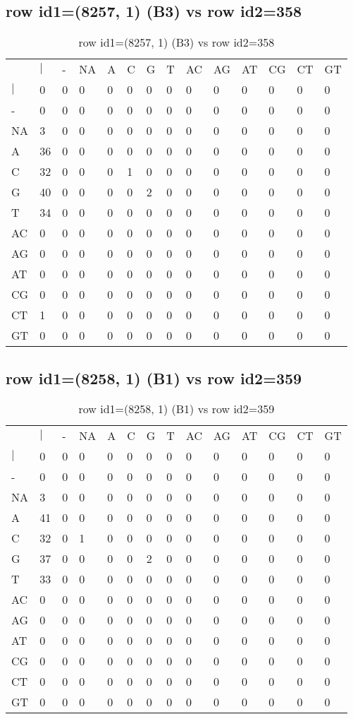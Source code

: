 \subsection{row id1=(8257, 1) (B3) vs row id2=358}
\begin{center}
\begin{longtable}{|l|l|l|l|l|l|l|l|l|l|l|l|l|l|}
\caption{row id1=(8257, 1) (B3) vs row id2=358} \label{table_dm396}\\
\hline
\\
\hline
&$|$&-&NA&A&C&G&T&AC&AG&AT&CG&CT&GT\\
$|$&0&0&0&0&0&0&0&0&0&0&0&0&0\\
-&0&0&0&0&0&0&0&0&0&0&0&0&0\\
NA&3&0&0&0&0&0&0&0&0&0&0&0&0\\
A&36&0&0&0&0&0&0&0&0&0&0&0&0\\
C&32&0&0&0&1&0&0&0&0&0&0&0&0\\
G&40&0&0&0&0&2&0&0&0&0&0&0&0\\
T&34&0&0&0&0&0&0&0&0&0&0&0&0\\
AC&0&0&0&0&0&0&0&0&0&0&0&0&0\\
AG&0&0&0&0&0&0&0&0&0&0&0&0&0\\
AT&0&0&0&0&0&0&0&0&0&0&0&0&0\\
CG&0&0&0&0&0&0&0&0&0&0&0&0&0\\
CT&1&0&0&0&0&0&0&0&0&0&0&0&0\\
GT&0&0&0&0&0&0&0&0&0&0&0&0&0\\
\hline
\end{longtable}
\end{center}

\subsection{row id1=(8258, 1) (B1) vs row id2=359}
\begin{center}
\begin{longtable}{|l|l|l|l|l|l|l|l|l|l|l|l|l|l|}
\caption{row id1=(8258, 1) (B1) vs row id2=359} \label{table_dm398}\\
\hline
\\
\hline
&$|$&-&NA&A&C&G&T&AC&AG&AT&CG&CT&GT\\
$|$&0&0&0&0&0&0&0&0&0&0&0&0&0\\
-&0&0&0&0&0&0&0&0&0&0&0&0&0\\
NA&3&0&0&0&0&0&0&0&0&0&0&0&0\\
A&41&0&0&0&0&0&0&0&0&0&0&0&0\\
C&32&0&1&0&0&0&0&0&0&0&0&0&0\\
G&37&0&0&0&0&2&0&0&0&0&0&0&0\\
T&33&0&0&0&0&0&0&0&0&0&0&0&0\\
AC&0&0&0&0&0&0&0&0&0&0&0&0&0\\
AG&0&0&0&0&0&0&0&0&0&0&0&0&0\\
AT&0&0&0&0&0&0&0&0&0&0&0&0&0\\
CG&0&0&0&0&0&0&0&0&0&0&0&0&0\\
CT&0&0&0&0&0&0&0&0&0&0&0&0&0\\
GT&0&0&0&0&0&0&0&0&0&0&0&0&0\\
\hline
\end{longtable}
\end{center}


